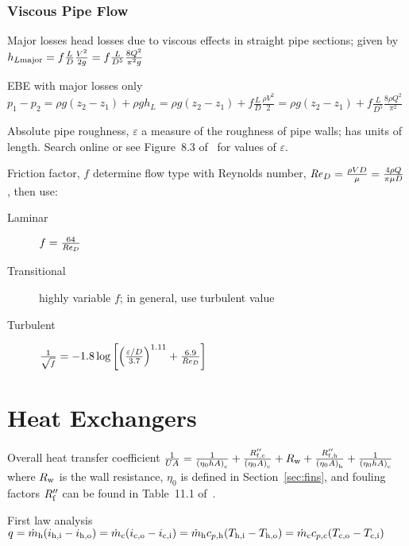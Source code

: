 \documentclass{article}
\begin{document}
\subsubsection{Viscous Pipe Flow}
\begin{description*}
\item[Major losses] head losses due to viscous effects in straight pipe sections; given by
  \(h_{L\mathrm{major}} = f\frac{L}{D}\frac{V^2}{2g} = f\frac{L}{D^5}\frac{8Q^2}{\pi^2g}\)
\item[EBE with major losses only]
  \(p_1-p_2 = \rho{}g(z_2-z_1)+\rho{}gh_L = \rho{}g(z_2-z_1) + f\frac{L}{D}\frac{\rho{}V^2}{2}
  = \rho{}g(z_2-z_1) + f\frac{L}{D^5}\frac{8\rho{}Q^2}{\pi^2}\)
\item[Absolute pipe roughness, $\varepsilon$] a measure of the roughness of pipe walls; has units of
  length. Search online or see Figure~8.3 of~\cite{hamt} for values of $\varepsilon$.
\item[Friction factor, $f$] determine flow type with Reynolds number,
  \(\mathord{\mathit{Re}}_D = \frac{\rho{}VD}{\mu} = \frac{4\rho{}Q}{\pi\mu{}D}\), then use:
  \begin{description}
  \item[Laminar]
    \(f = \frac{64}{\mathord{\mathit{Re}}_D}\)
  \item[Transitional]
    highly variable $f$; in general, use turbulent value
  \item[Turbulent]
    \(\frac{1}{\sqrt{f}}
    = -1.8\log\left[{\left(\frac{\varepsilon/D}{3.7}\right)}^{1.11}
      + \frac{6.9}{\mathord{\mathit{Re}}_D}\right]\)
  \end{description}
\end{description*}

\section{Heat Exchangers}
\label{sec:heat-exchangers}

\begin{description*}
\item[Overall heat transfer coefficient]
  \(\frac{1}{UA} = \frac{1}{{(\eta_0 h A)}_{\mathrm{c}}} + \frac{R_{\mathrm{f,c}}''}{{(\eta_0 A)}_{\mathrm{c}}}
  + R_{\mathrm{w}} + \frac{R_{\mathrm{f,h}}''}{{(\eta_0 A)}_{\mathrm{h}}} + \frac{1}{{(\eta_0 h A)}_{\mathrm{c}}}\)
  where $R_{\mathrm{w}}$ is the wall resistance, $\eta_0$ is defined in Section~\ref{sec:fins}, and
  fouling factors $R_{\mathrm{f}}''$ can be found in Table~11.1 of~\cite{hamt}.
\item[First law analysis]
  \(q = \dot{m}_{\mathrm{h}}(i_{\mathrm{h,i}} - i_{\mathrm{h,o}})
  = \dot{m}_{\mathrm{c}}(i_{\mathrm{c,o}} - i_{\mathrm{c,i}})
  = \dot{m}_{\mathrm{h}}c_{p,\mathrm{h}}(T_{\mathrm{h,i}} - T_{\mathrm{h,o}})
  = \dot{m}_{\mathrm{c}}c_{p,\mathrm{c}}(T_{\mathrm{c,o}} - T_{\mathrm{c,i}})\)
\end{description*}
\end{document}
